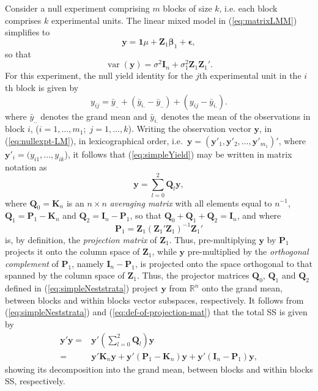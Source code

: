 \documentclass[article]{jss}
\newcommand{\mP}{\mathbf{P}}
\newcommand{\I}{\mathbf{I}}
\newcommand{\K}{\mathbf{K}}
\newcommand{\Z}{\mathbf{Z}}
\newcommand{\Q}{\mathbf{Q}}
\begin{document}
Consider a null experiment comprising $m$ blocks of size $k$, i.e. each block comprises $k$ experimental units. The linear mixed model in (\ref{eq:matrixLMM}) simplifies to 
\begin{equation}
\label{eq:nullexpt-LM}
\bm{y} = \mathbf{1}\mu + \Z_1\bm{\beta}_1 + \bm{\epsilon},
\end{equation}
so that 
\[
\operatorname{var}(\bm{y}) = \sigma^2\I_n + \sigma_1^2 \Z_1\Z_1'.
\]
For this experiment, the null yield identity for the $j$th experimental unit in the $i$th block is given by
\begin{equation}\label{eq:simpleYield}
y_{ij} = \bar{y}_{..} + (\bar{y}_{i.} - \bar{y}_{..}) + (y_{ij} - \bar{y}_{i.}).
\end{equation}
where $\bar{y}_{..}$ denotes the grand mean and $\bar{y}_{i.}$ denotes the mean of the observations in block $i$, ($i = 1, \dots, m_1;\; j = 1, \dots, k $). Writing the observation vector $\bm{y}$, in (\ref{eq:nullexpt-LM}), in lexicographical order, i.e.\ $\bm{y}=(\bm{y}'_1,\bm{y}'_2,\ldots,\bm{y}'_{m_1})'$, where $\bm{y}'_i=(y_{i1},\ldots,y_{ik}$), it follows that (\ref{eq:simpleYield}) may be written in matrix notation as 
\begin{equation}\label{eq:simpleNeststrata}
\bm{y} = \sum_{l=0}^{2} \Q_l \bm{y},
\end{equation}
where $\Q_{0}=\K_{n}$ is an $n \times n$ \emph{averaging matrix} with all elements equal to $n^{-1}$,  $\Q_1 = \mP_1-\K_n$ and $\Q_2 = \I_n - \mP_1$, so that $\Q_0+\Q_1+\Q_2=\I_n$, and where 
\begin{equation}\label{eq:def-of-projection-mat}
\mP_1 = \Z_{1}(\Z_{1}'\Z_{1})^{-1}\Z_{1}'
\end{equation} 
is, by definition, the \emph{projection matrix} of $\Z_{1}$. Thus, pre-multiplying $\bm{y}$ by $\mP_1$ projects it onto the column space of $\Z_{1}$, while $\bm{y}$ pre-multiplied by the \emph{orthogonal complement} of $\mP_1$, namely $\I_{n} - \mP_1$, is projected onto the space orthogonal to that spanned by the column space of  $\Z_{1}$. Thus, the projector matrices $\Q_0$, $\Q_1$ and $\Q_2$ defined in (\ref{eq:simpleNeststrata}) project $\bm{y}$ from $\mathbb{R}^n$ onto the grand mean, between blocks and within blocks vector subspaces, respectively. It follows from (\ref{eq:simpleNeststrata}) and (\ref{eq:def-of-projection-mat}) that the total SS is given by
\begin{align}
\bm{y}'\bm{y} = & \bm{y}' \left(\sum_{l=0}^{2} \Q_l\right)\bm{y} \label{eq:infoDecomp1a} \\
              = & \bm{y}'\K_n\bm{y} + \bm{y}'(\mP_{1}-\K_n)\bm{y} + \bm{y}'(\I_n - \mP_{1})\bm{y}, \label{eq:infoDecomp1b}
\end{align}
showing its decomposition into the grand mean, between blocks and within blocks SS, respectively.
\end{document}
